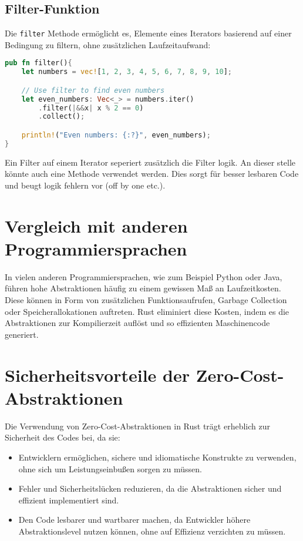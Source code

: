 \subsection{Filter-Funktion}

Die \texttt{filter} Methode ermöglicht es, Elemente eines Iterators basierend auf einer Bedingung zu filtern, ohne zusätzlichen Laufzeitaufwand:

\begin{lstlisting}[language=Rust, caption=Filter-Funktion]
pub fn filter(){
    let numbers = vec![1, 2, 3, 4, 5, 6, 7, 8, 9, 10];

    // Use filter to find even numbers
    let even_numbers: Vec<_> = numbers.iter()
        .filter(|&&x| x % 2 == 0)
        .collect();

    println!("Even numbers: {:?}", even_numbers);
}
\end{lstlisting}
Ein Filter auf einem Iterator seperiert zusätzlich die Filter logik.
An dieser stelle könnte auch eine Methode verwendet werden.
Dies sorgt für besser lesbaren Code und beugt logik fehlern vor (off by one etc.).
\section{Vergleich mit anderen Programmiersprachen}

In vielen anderen Programmiersprachen, wie zum Beispiel Python oder Java, führen hohe Abstraktionen häufig zu einem gewissen Maß an Laufzeitkosten. 
Diese können in Form von zusätzlichen Funktionsaufrufen, Garbage Collection oder Speicherallokationen auftreten. 
Rust eliminiert diese Kosten, indem es die Abstraktionen zur Kompilierzeit auflöst und so effizienten Maschinencode generiert.

\section{Sicherheitsvorteile der Zero-Cost-Abstraktionen}

Die Verwendung von Zero-Cost-Abstraktionen in Rust trägt erheblich zur Sicherheit des Codes bei, da sie:
\begin{itemize}
    \item Entwicklern ermöglichen, sichere und idiomatische Konstrukte zu verwenden, ohne sich um Leistungseinbußen sorgen zu müssen.
    \item Fehler und Sicherheitslücken reduzieren, da die Abstraktionen sicher und effizient implementiert sind.
    \item Den Code lesbarer und wartbarer machen, da Entwickler höhere Abstraktionslevel nutzen können, ohne auf Effizienz verzichten zu müssen.
\end{itemize}
